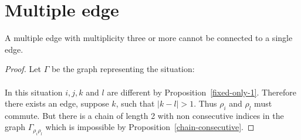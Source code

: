 \section{Multiple edge}

\begin{proposition}
  A multiple edge with multiplicity three or more cannot be connected to a single edge.
\end{proposition}

\begin{proof}
  Let $\Gamma$ be the graph representing the situation:

  \begin{figure}[H]
    \begin{center}
      \caption{}
    \end{center}
  \end{figure}

  \paragraph{}
  In this situation $i,j,k$ and $l$ are different by Proposition~\ref{fixed-only-1}. Therefore there exists an edge, suppose $k$, such that $|k - l| > 1$. Thus $\rho_i$ and $\rho_l$ must commute. But there is a chain of length 2 with non consecutive indices in the graph $\Gamma_{\rho_i \rho_l}$ which is impossible by Proposition~\ref{chain-consecutive}.
\end{proof}

